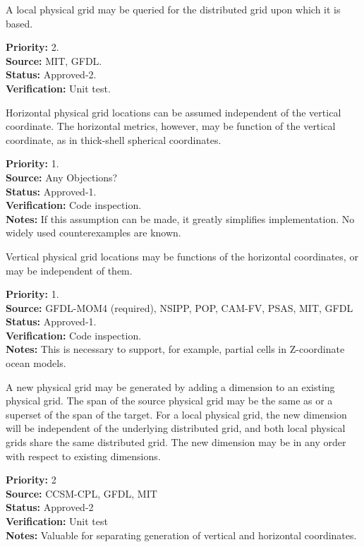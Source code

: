A local physical grid may be queried for the distributed grid upon which it is based.
\begin{reqlist}
{\bf Priority:} 2. \\
{\bf Source:}  MIT, GFDL.\\
{\bf Status:} Approved-2. \\
{\bf Verification:} Unit test. 
\end{reqlist}

Horizontal physical grid locations can be assumed independent of the vertical coordinate.
The horizontal metrics, however, may be function of the vertical coordinate, as
in thick-shell spherical coordinates.
\begin{reqlist}
{\bf Priority:} 1. \\
{\bf Source:} Any Objections? \\
{\bf Status:} Approved-1. \\
{\bf Verification:} Code inspection.\\
{\bf Notes:} If this assumption can be made, it greatly simplifies implementation.
No widely used counterexamples are known.
\end{reqlist}

Vertical physical grid locations may be functions of the horizontal coordinates, or may be
independent of them.
\begin{reqlist}
{\bf Priority:} 1. \\
{\bf Source:} GFDL-MOM4 (required), NSIPP, POP, 
              CAM-FV, PSAS, MIT, GFDL \\
{\bf Status:} Approved-1. \\
{\bf Verification:} Code inspection.\\
{\bf Notes:} This is necessary to support, for example, partial cells in
Z-coordinate ocean models.
\end{reqlist}

A new physical grid may be generated by adding a dimension to an existing 
physical grid.  The span of the source physical grid may be the same as or a superset of
the span of the target.  For a local physical grid, the new dimension will be independent 
of the underlying distributed grid, and both local physical grids share the same 
distributed grid.  The new dimension may be in any order with respect to existing dimensions.
\begin{reqlist}
{\bf Priority:} 2 \\
{\bf Source:} CCSM-CPL, GFDL, MIT \\
{\bf Status:} Approved-2 \\
{\bf Verification:} Unit test\\
{\bf Notes:} Valuable for separating generation of vertical and horizontal
coordinates.
\end{reqlist}

